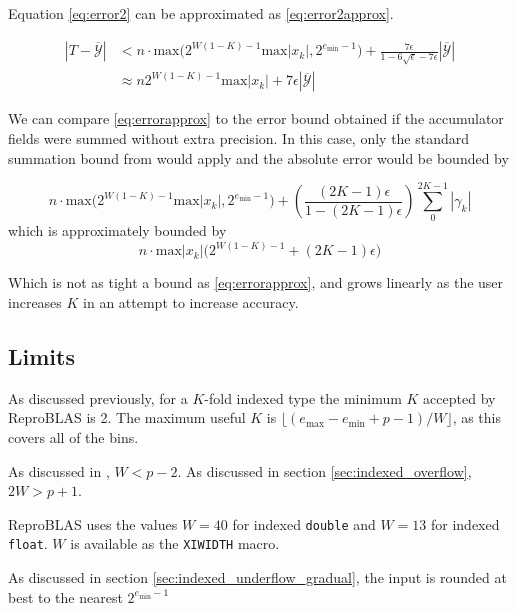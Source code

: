 \documentclass[12pt]{article}
\providecommand{\min}{\ensuremath{\text{min}}}
\providecommand{\max}{\ensuremath{\text{max}}}
\theoremstyle{definition}
\numberwithin{equation}{section}
\numberwithin{figure}{section}
\begin{document}
    Equation \eqref{eq:error2} can be approximated as  \eqref{eq:error2approx}.

    \begin{align}
      |T - \overline{\mathcal{Y}}| &< n \cdot \max\bigl(2^{W  (1 - K) - 1}  \max|x_k|, 2^{e_{\min} - 1}\bigr) + \frac{7\epsilon}{1 - 6 \sqrt \epsilon - 7\epsilon}  \left|\overline{\mathcal{Y}}\right| \nonumber \\
      &\approx n  2^{W  (1 - K) - 1} \max|x_k|+ 7 \epsilon \left|\overline{\mathcal{Y}}\right|
      \label{eq:error2approx}
    \end{align}

    We can compare  \eqref{eq:errorapprox} to the error bound obtained if the accumulator fields were summed without extra precision. In this case, only the standard summation bound from \cite{higham} would apply and the absolute error would be bounded by

    \begin{equation*}
    n \cdot \max\bigl(2^{W  (1 - K) - 1}  \max|x_k|, 2^{e_{\min} - 1}\bigr) + \left(\frac{(2  K - 1)  \epsilon}{1 - (2  K - 1)  \epsilon}\right)  \sum\limits_0^{2  K - 1}|\gamma_k|
    \end{equation*}
    which is approximately bounded by
    \begin{equation}
    n \cdot \max|x_k| \bigl(2^{W  (1 - K) - 1} + (2  K - 1)  \epsilon\bigr)
    \label{eq:baderrorapprox}
    \end{equation}

    Which is not as tight a bound as \eqref{eq:errorapprox}, and grows linearly as the user increases $K$ in an attempt to increase accuracy.

  \subsection{Limits}
    \label{sec:primitiveops_limits}
    As discussed previously, for a $K$-fold indexed type the minimum $K$ accepted by ReproBLAS is 2. The maximum useful $K$ is $\lfloor(e_{\max} - e_{\min} + p - 1)/W\rfloor$, as this covers all of the bins.

    As discussed in \cite{repsum}, $W < p - 2$. As discussed in section \ref{sec:indexed_overflow}, $2 W > p + 1$.

    ReproBLAS uses the values $W = 40$ for indexed \texttt{double} and $W = 13$ for indexed \texttt{float}. $W$ is available as the \texttt{XIWIDTH} macro.

    As discussed in section \ref{sec:indexed_underflow_gradual}, the input is rounded at best to the nearest $2^{e_{\min} - 1}$
\end{document}
